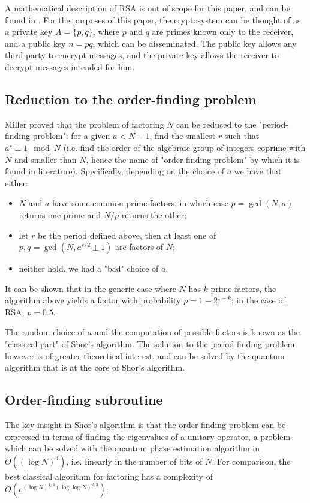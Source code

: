 \documentclass[conference]{IEEEtran}
\begin{document}
A mathematical description of RSA is out of scope for this paper, and can be found in \cite{rsa}. For the purposes of this paper, the cryptosystem can be thought of as a private key $A = \{p, q\}$, where $p$ and $q$ are primes known only to the receiver, and a public key $n=pq$, which can be disseminated. The public key allows any third party to encrypt messages, and the private key allows the receiver to decrypt messages intended for him.

\subsection{Reduction to the order-finding problem}
Miller \cite{miller} proved that the problem of factoring $N$ can be reduced to the "period-finding problem": for a given $a < N - 1$, find the smallest $r$ such that $a^r \equiv 1 \mod N$ (i.e. find the order of the algebraic group of integers coprime with $N$ and smaller than $N$, hence the name of "order-finding problem" by which it is found in literature). Specifically, depending on the choice of $a$ we have that either:
\begin{itemize}
\item $N$ and $a$ have some common prime factors, in which case $p=\gcd(N, a)$ returns one prime and $N/p$ returns the other;
\item let $r$ be the period defined above, then at least one of $p, q = \gcd(N, a^{r/2}\pm 1)$ are factors of $N$;
\item neither hold, we had a "bad" choice of $a$.
\end{itemize}

It can be shown that in the generic case where $N$ has $k$ prime factors, the algorithm above yields a factor with probability $p=1-2^{1-k}$; in the case of RSA, $p=0.5$.

The random choice of $a$ and the computation of possible factors is known as the "classical part" of Shor's algorithm. The solution to the period-finding problem however is of greater theoretical interest, and can be solved by the quantum algorithm that is at the core of Shor's algorithm.

\subsection{Order-finding subroutine}\label{order-finding}
The key insight in Shor's algorithm is that the order-finding problem can be expressed in terms of finding the eigenvalues of a unitary operator, a problem which can be solved with the quantum phase estimation algorithm in $O((\log N)^3)$, i.e. linearly in the number of bits of $N$. For comparison, the best classical algorithm for factoring has a complexity of $O(e^{(\log N)^{1/3}(\log\log N)^{2/3}})$.
\end{document}
